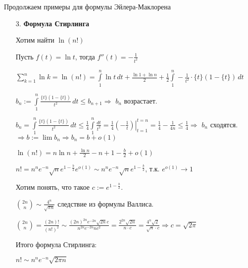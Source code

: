Продолжаем примеры для формулы Эйлера-Маклорена
\begin{example} \thmslashn
\begin{enumerate}
    \item[3.] \textbf{Формула Стирлинга}
    
    Хотим найти $\ln (n!)$
    
    Пусть $f(t) = \ln t$, тогда $f''(t) = -\frac{1}{t^2}$
    
    $\sum\limits_{k=1}^{n} \ln k = \ln (n!) = \int\limits_{1}^{n} \ln t \,dt + \frac{\ln 1 + \ln n}{2} + \frac{1}{2} \int\limits_{1}^{n} -\frac{1}{t^2} \cdot \{t\}(1 - \{t\})\,dt$
    
    $b_n := \int\limits_{1}^{n} \frac{\{t\}(1 - \{t\})}{t^2}\,dt \leqslant b_{n+1} \Rightarrow$ $b_n$ возрастает.
    
    $b_n = \int\limits_{1}^{n} \frac{\{t\}(1 - \{t\})}{t^2}\,dt \leqslant \frac{1}{4}\int\limits_{1}^{n} \frac{dt}{t^2} = \left.\frac{1}{4} \left( -\frac{1}{t} \right) \right|_{t=1}^{t=n} = \frac{1}{4} - \frac{1}{4n} \leqslant \frac{1}{4} \Rightarrow$ $b_n$ сходятся. $\Rightarrow b:= \lim b_n \Rightarrow b_n = b + o(1)$
    
    $\ln(n!) = n\ln n + \frac{\ln n}{2} -n + 1 -\frac{b}{2} + o(1)$
    
    $n! = n^n e^{-n} \sqrt{n} e^{1-\frac{b}{2}} e^{o(1)} \sim n^ne^{-n}\sqrt{n}e^{1-\frac{b}{2}}$, т.к. $e^{o(1)} \to 1$
    
    Хотим понять, что такое $c := e^{1-\frac{b}{2}}$.
    
    $\binom{2n}{n} \sim \frac{4^n}{\sqrt{\pi n}}$ следствие из формулы Валлиса.
    
    $\binom{2n}{n} = \frac{(2n)!}{(n!)^2} \sim \frac{(2n)^{2n} e^{-2n}\sqrt{2n} c}{n^{2n} e^{-2n} n c^2} = \frac{2^{2n} \sqrt{2n}}{n\cdot c} = \frac{4^n \sqrt{2}}{\sqrt{n} \cdot c} \Rightarrow c = \sqrt{2 \pi}$
    
    
    Итого формула Стирлинга:
    
    $n! \sim n^ne^{-n}\sqrt{2 \pi n}$
    
\end{enumerate}
\end{example}